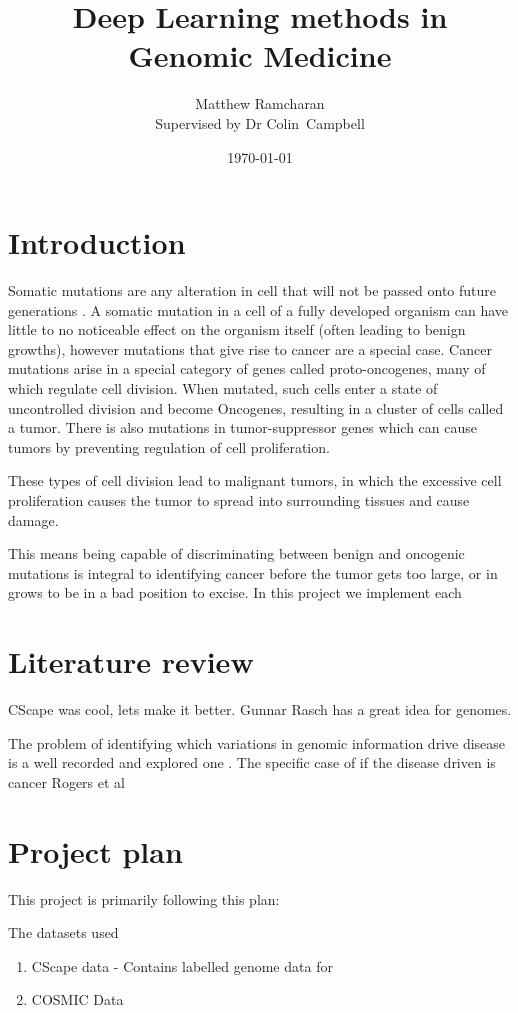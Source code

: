 \documentclass[11pt]{article}
\title{Deep Learning methods in Genomic Medicine}
\author{Matthew Ramcharan \\ Supervised by Dr Colin\ Campbell}
\date{\today}
\begin{document}
\maketitle

\section{Introduction}

Somatic mutations are any alteration in cell that will not be passed onto future generations \cite{Griffiths2000}. A somatic mutation in a cell of a fully developed organism can have little to no noticeable effect on the organism itself (often leading to benign growths), however mutations that give rise to cancer are a special case. Cancer mutations arise in a special category of genes called proto-oncogenes, many of which regulate cell division. When mutated, such cells enter a state of uncontrolled division and become Oncogenes, resulting in a cluster of cells called a tumor.  There is also mutations in tumor-suppressor genes which can cause tumors by preventing regulation of cell proliferation.

These types of cell division lead to malignant tumors, in which the excessive cell proliferation causes the tumor to spread into surrounding tissues and cause damage. 

This means being capable of discriminating between benign and oncogenic mutations is integral to identifying cancer before the tumor gets too large, or in grows to be in a bad position to excise. In this project we implement each 


\section{Literature review}
CScape was cool, lets make it better.
Gunnar Rasch has a great idea for genomes.

The problem of identifying which variations in genomic information drive disease is a well recorded and explored one \cite{Rogers2017,Quang2015,Shihab2013}. The specific case of if the disease driven is cancer
Rogers et al \cite{Rogers2017}


\section{Project plan}

This project is primarily following this plan:

The datasets used
\begin{enumerate}
	\item CScape data \cite{Rogers2017} - Contains labelled genome data for 
	\item COSMIC Data
\end{enumerate}
\end{document}
